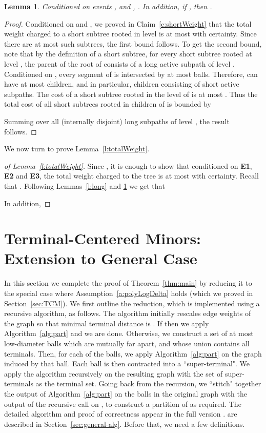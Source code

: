 \documentclass[twoside,leqno,twocolumn]{article}
\newtheorem{lemma}[theorem]{Lemma}
\newcommand{\proofof}[1]{of #1}
\newcommand{\proofof}[1]{Proof of #1}
\begin{document}
\begin{lemma}\label{l:short}
Conditioned on events ,  and , .  In addition, if , then .
\end{lemma}
\begin{proof}
Conditioned on  and , we proved in Claim~\ref{c:shortWeight} that the total weight charged to a short subtree rooted in level  is at most  with certainty. Since there are at most  such subtrees, the first bound follows.
To get the second bound, note that by the definition of a short subtree, for every short subtree  rooted at level , the parent of the root of  consists of a long active subpath  of level . Conditioned on , every segment of  is intersected by at most  balls. Therefore,  can have at most  children, and in particular, children consisting of short active subpaths. The cost of a short subtree rooted in the  level of  is at most . Thus the total cost of all short subtrees rooted in children of  is bounded by 

Summing over all (internally disjoint) long subpaths of level , the result follows.
\end{proof}
We now turn to prove Lemma~\ref{l:totalWeight}.
\begin{proof}[\proofof{Lemma~\ref{l:totalWeight}}]
Since , it is enough to show that conditioned on {\bf E1}, {\bf E2} and {\bf E3}, the total weight charged to the tree is at most  with certainty.
Recall that . Following Lemmas~\ref{l:long} and \ref{l:short} we get that
\ifprocs

\else

\fi
In addition,
\ifprocs

\else

\fi
\end{proof}


\section{Terminal-Centered Minors: Extension to General Case}\label{sec:proofDiscard}

In this section we complete the proof of Theorem~\ref{thm:main} by reducing it to the special case where Assumption~\ref{a:polyLogDelta} holds (which we proved in Section~\ref{sec:TCM}).
We first outline the reduction, which is implemented using a recursive algorithm,
as follows. 
The algorithm initially rescales edge weights of the graph so that minimal terminal distance is . If  then we apply Algorithm~\ref{alg:part} and we are done. Otherwise, we construct a set of at most  low-diameter balls which are mutually far apart, and whose union contains all terminals. Then, for each of the balls, we apply Algorithm~\ref{alg:part} on the graph induced by that ball. 
Each ball is then contracted into a ``super-terminal". We apply the algorithm recursively on the resulting graph  with the set of super-terminals as the terminal set. Going back from the recursion, we ``stitch" together the output of Algorithm~\ref{alg:part} on the balls in the original graph with the output of the recursive call on , to construct a partition of  as required.
The detailed algorithm and proof of correctness  
\ifprocs
appear in the full version \cite{KKN13}.
\else
are described in Section~\ref{sec:general-alg}. Before that, we need a few definitions.
\end{document}
